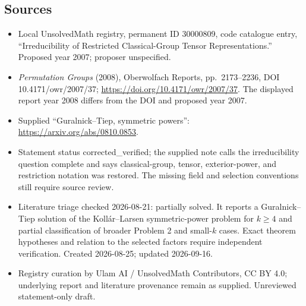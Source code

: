 \documentclass[11pt]{article}
\begin{document}
\subsection{Sources}
\begin{itemize}
\item Local UnsolvedMath registry, permanent ID 30000809, code catalogue entry, ``Irreducibility of Restricted Classical-Group Tensor Representations.'' Proposed year 2007; proposer unspecified.
\item \emph{Permutation Groups} (2008), Oberwolfach Reports, pp.\ 2173--2236, DOI 10.4171/owr/2007/37; \url{https://doi.org/10.4171/owr/2007/37}. The displayed report year 2008 differs from the DOI and proposed year 2007.
\item Supplied ``Guralnick--Tiep, symmetric powers'': \url{https://arxiv.org/abs/0810.0853}.
\item Statement status corrected\_verified; the supplied note calls the irreducibility question complete and says classical-group, tensor, exterior-power, and restriction notation was restored. The missing field and selection conventions still require source review.
\item Literature triage checked 2026-08-21: partially solved. It reports a Guralnick--Tiep solution of the Koll\'ar--Larsen symmetric-power problem for $k\ge4$ and partial classification of broader Problem 2 and small-$k$ cases. Exact theorem hypotheses and relation to the selected factors require independent verification. Created 2026-08-25; updated 2026-09-16.
\item Registry curation by Ulam AI / UnsolvedMath Contributors, CC BY 4.0; underlying report and literature provenance remain as supplied. Unreviewed statement-only draft.
\end{itemize}
\end{document}
